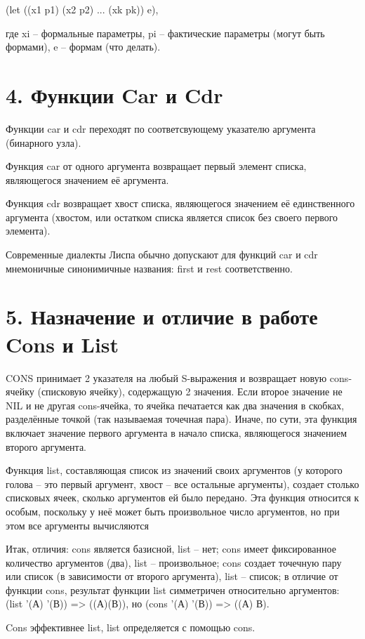\documentclass[12pt]{report}
\begin{document}
(let ((x1 p1) (x2 p2) ... (xk pk))  e),

где xi -- формальные параметры, pi -- фактические параметры (могут быть формами), e -- формам (что делать).

\section*{4. Функции Car и Cdr}

Функции car и cdr переходят по соответсвующему указателю аргумента (бинарного узла).

Функция car от одного аргумента возвращает первый элемент списка, являющегося значением её аргумента. 

Функция cdr возвращает хвост списка, являющегося значением её единственного аргумента (хвостом, или остатком списка является список  без своего первого элемента).  

Современные диалекты  Лиспа обычно допускают для функций car и cdr мнемоничные синонимичные названия: first и rest соответственно.

\section*{5. Назначение и отличие в работе Cons и List}

CONS принимает 2 указателя на любый S-выражения и возвращает новую cons-ячейку (списковую ячейку), содержащую 2 значения. Если второе значение не NIL и не другая cons-ячейка, то ячейка печатается как два значения в скобках, разделённые точкой (так называемая точечная пара). Иначе, по сути, эта функция включает значение первого аргумента в начало списка, являющегося значением второго аргумента. 

Функция list, составляющая список из значений своих аргументов (у которого голова -- это первый аргумент, хвост -- все остальные аргументы), создает столько списковых ячеек, сколько аргументов ей было передано. Эта функция относится к особым, поскольку у неё может быть произвольное число аргументов, но при этом все аргументы вычисляются

Итак, отличия: cons является базисной, list -- нет; cons имеет  фиксированное количество аргументов (два), list -- произвольное; cons создает точечную пару или список (в зависимости от второго аргумента), list -- список; в отличие от функции cons, результат функции list симметричен относительно аргументов: (list '(А) '(В)) => ((А)(В)), но (cons '(А) '(В)) => ((А) В).

Cons эффективнее list, list определяется с помощью cons.
\end{document}
